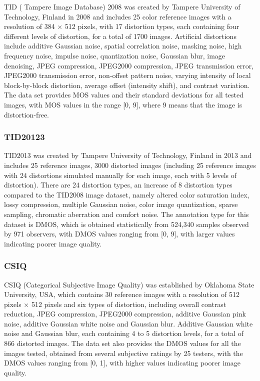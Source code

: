 \documentclass{article}
\begin{document}
TID ( Tampere Image Database) 2008 \cite{ponomarenko2009tid2008} was created by Tampere University of Technology, Finland in 2008 and includes 25 color reference images with a resolution of 384 × 512 pixels, with 17 distortion types, each containing four different levels of distortion, for a total of 1700 images. Artificial distortions include additive Gaussian noise, spatial correlation noise, masking noise, high frequency noise, impulse noise, quantization noise, Gaussian blur, image denoising, JPEG compression, JPEG2000 compression, JPEG transmission error, JPEG2000 transmission error, non-offset pattern noise, varying intensity of local block-by-block distortion, average offset (intensity shift), and contrast variation. The data set provides MOS values and their standard deviations for all tested images, with MOS values in the range [0, 9], where 9 means that the image is distortion-free.

\subsubsection{TID20123}
\label{TID2013}

TID2013 \cite{ponomarenko2013color} was created by Tampere University of Technology, Finland in 2013 and includes 25 reference images, 3000 distorted images (including 25 reference images with 24 distortions simulated manually for each image, each with 5 levels of distortion). There are 24 distortion types, an increase of 8 distortion types compared to the TID2008 image dataset, namely altered color saturation index, lossy compression, multiple Gaussian noise, color image quantization, sparse sampling, chromatic aberration and comfort noise. The annotation type for this dataset is DMOS, which is obtained statistically from 524,340 samples observed by 971 observers, with DMOS values ranging from [0, 9], with larger values indicating poorer image quality.

\subsubsection{CSIQ}
\label{CSIQ}

CSIQ (Categorical Subjective Image Quality) \cite{larson2010most} was established by Oklahoma State University, USA, which contains 30 reference images with a resolution of 512 pixels × 512 pixels and six types of distortion, including overall contrast reduction, JPEG compression, JPEG2000 compression, additive Gaussian pink noise, additive Gaussian white noise and Gaussian blur. Additive Gaussian white noise and Gaussian blur, each containing 4 to 5 distortion levels, for a total of 866 distorted images. The data set also provides the DMOS values for all the images tested, obtained from several subjective ratings by 25 testers, with the DMOS values ranging from [0, 1], with higher values indicating poorer image quality.
\end{document}

